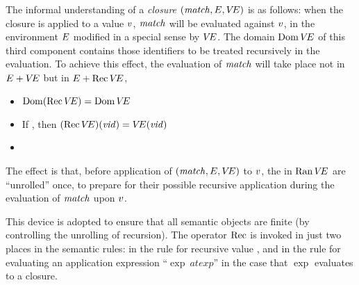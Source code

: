 The informal understanding of a {\sl {} closure} $({\it match},E,\mbox{$V\!E$})$ is as follows:
when the  closure is applied to a value $v$,
${\it match}$ will be evaluated against $v$, in the environment $E$ modified in
a special sense by
$\mbox{$V\!E$}$.  The domain $\mathop{\rm Dom}\nolimits\mbox{$V\!E$}$ of this third component contains those identifiers to be treated recursively in the evaluation.  To achieve this
effect, the evaluation of ${\it match}$ will take place not in $E + \mbox{$V\!E$}$
but in $E + \mathop{\rm Rec}\nolimits\mbox{$V\!E$}$, 
\medskip

\begin{itemize}
\item $\mathop{\rm Dom}\nolimits(\mathop{\rm Rec}\nolimits\mbox{$V\!E$})=\mathop{\rm Dom}\nolimits\mbox{$V\!E$} $
\item If \replacement{\theidstatus}{$\VE(\var)\notin\Closure$}{$\VE(\vid)\notin\FcnClosure\times\{\isv\}$}, 
then $(\mathop{\rm Rec}\nolimits\mbox{$V\!E$})({\it vid})=\mbox{$V\!E$}({\it vid})$
\item {}
\end{itemize}
The effect is that, before application of $({\it match},E,\mbox{$V\!E$})$ to $v$, the
in $\mathop{\rm Ran}\nolimits\mbox{$V\!E$}$ are ``unrolled'' once, to prepare for their possible
recursive application during the evaluation of ${\it match}$ upon $v$.

This device is adopted to ensure that all semantic objects are finite (by
controlling the unrolling of recursion).  The operator $\mathop{\rm Rec}\nolimits$ is invoked in
just two places in the semantic rules: in the rule for recursive value 
, and in the rule for evaluating
an application expression ``$\exp\ atexp$'' in the case that $\exp$
evaluates to a  closure.

